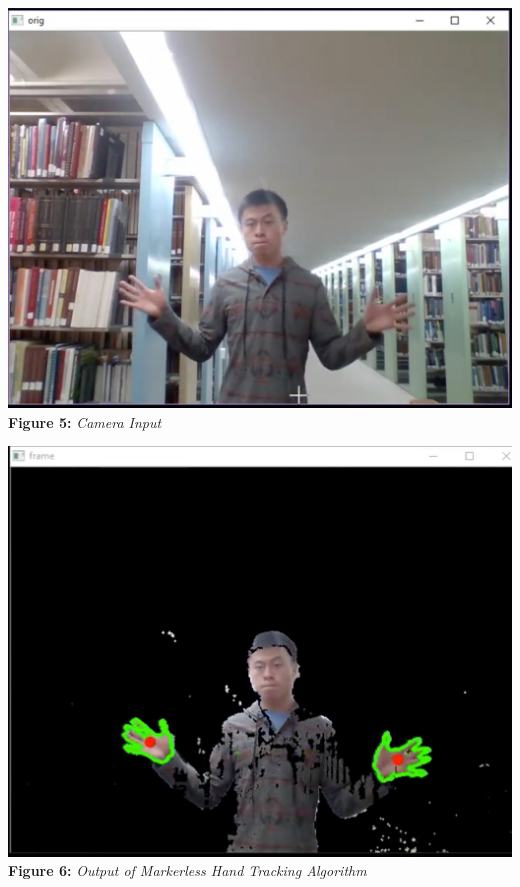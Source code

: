 \documentclass[twoside,twocolumn]{article}
\begin{document}
\begin{center}
	\includegraphics[scale=0.12]{hand_tracking_1} \\
	\vspace{0.25cm}
	\small{\textbf{Figure 5:} \textit{Camera Input}}
	\end{center}

\begin{center}
	\includegraphics[scale=0.25]{hand_tracking_2} \\
	\vspace{0.25cm}
	\small{\textbf{Figure 6:} \textit{Output of Markerless Hand Tracking Algorithm}}
\end{center}
\end{document}
